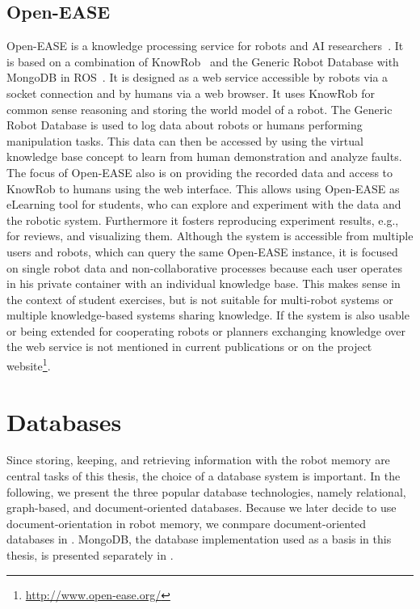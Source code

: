 \subsection{Open-EASE}
\label{sec:openease}
Open-EASE is a knowledge processing service for robots and AI
researchers~\cite{OpenEASE}. It is based on a combination of
KnowRob~\cite{KnowRob} and the Generic Robot Database with MongoDB in
ROS~\cite{RoboDB}. It is designed as a web service accessible by
robots via a socket connection and by humans via a web browser. It
uses KnowRob for common sense reasoning and storing the world model of
a robot. The Generic Robot Database is used to log data about robots
or humans performing manipulation tasks. This data can then be
accessed by using the virtual knowledge base concept to learn from
human demonstration and analyze faults. The focus of Open-EASE also is
on providing the recorded data and access to KnowRob to humans using
the web interface. This allows using Open-EASE as eLearning tool for
students, who can explore and experiment with the data and the robotic
system. Furthermore it fosters reproducing experiment results, e.g.,
for reviews, and visualizing them. Although the system is
accessible from multiple users and robots, which can query the same
Open-EASE instance, it is focused on single robot data and
non-collaborative processes because each user operates in his private
container with an individual knowledge base. This makes sense in the
context of student exercises, but is not suitable for multi-robot
systems or multiple knowledge-based systems sharing knowledge. If the
system is also usable or being extended for cooperating robots or
planners exchanging knowledge over the web service is not mentioned in
current publications or on the project
website\footnote{\url{http://www.open-ease.org/}}.

\section{Databases}
\label{sec:databases}
Since storing, keeping, and retrieving information with the robot
memory are central tasks of this thesis, the choice of a database
system is important. In the following, we present the three popular
database technologies, namely relational, graph-based, and
document-oriented databases. Because we later decide to use
document-orientation in robot memory, we conmpare document-oriented
databases in . MongoDB, the database
implementation used as a basis in this thesis, is presented separately
in .

